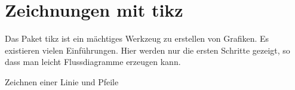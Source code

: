 
%
%

\chapter{Zeichnungen mit tikz}


Das Paket tikz ist ein mächtiges Werkzeug zu erstellen von Grafiken. Es existieren vielen Einführungen. Hier werden nur die ersten Schritte gezeigt, so dass man leicht Flussdiagramme erzeugen kann.

\bigskip

Zeichnen einer Linie und Pfeile

%



%


%



%


%



%


%



%


%





%


%

